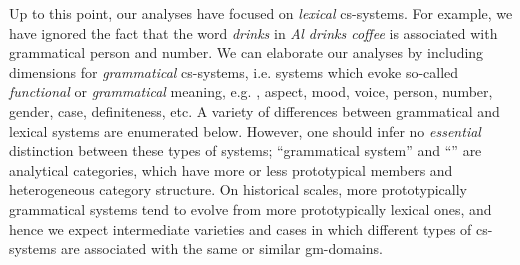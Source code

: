 Up to this point, our analyses have focused on \textit{lexical} cs-systems. For example, we have ignored the fact that the word \textit{drinks} in \textit{Al drinks coffee} is associated with grammatical person and number. We can elaborate our analyses by including  dimensions for \textit{grammatical} cs-systems, i.e. systems which evoke so-called \textit{functional} or \textit{grammatical} meaning, e.g. , aspect, mood, voice, person, number, gender, case, definiteness, etc. A variety of differences between grammatical and lexical systems are enumerated below. However, one should infer no \textit{essential} distinction between these types of systems; “grammatical system” and “” are analytical categories, which have more or less prototypical members and heterogeneous category structure. On historical scales, more prototypically grammatical systems tend to evolve from more prototypically lexical ones, and hence we expect intermediate varieties and cases in which different types of cs-systems are associated with the same or similar gm-domains. 

